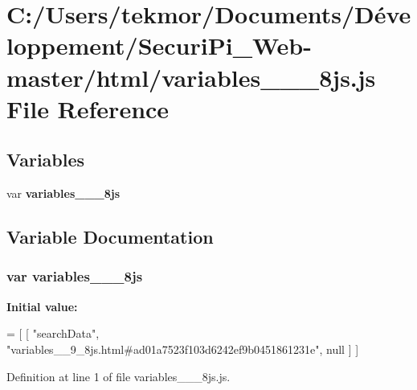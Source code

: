 \section{C\+:/\+Users/tekmor/\+Documents/\+Développement/\+Securi\+Pi\+\_\+\+Web-\/master/html/variables\+\_\+\+\_\+\_\+8js.js File Reference}
\label{variables____9__8js_8js}
\subsection*{Variables}
\begin{DoxyCompactItemize}
\item 
var {\bf variables\+\_\+\+\_\+\_\+8js}
\end{DoxyCompactItemize}


\subsection{Variable Documentation}
\subsubsection[{variables\+\_\+\+\_\+9\+\_\+8js}]{\setlength{\rightskip}{0pt plus 5cm}var variables\+\_\+\+\_\+\_\+8js}\label{variables____9__8js_8js_ae2e01f046a3cb8ded2febcd999e9defd}
{\bfseries Initial value\+:}
\begin{DoxyCode}
=
[
    [ \textcolor{stringliteral}{"searchData"}, \textcolor{stringliteral}{"variables\_\_9\_8js.html#ad01a7523f103d6242ef9b0451861231e"}, null ]
]
\end{DoxyCode}


Definition at line 1 of file variables\+\_\+\+\_\+\_\+8js.\+js.

